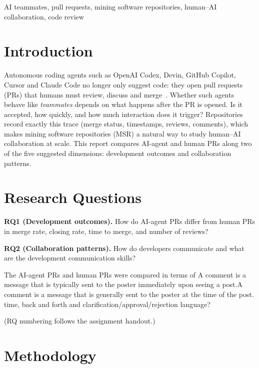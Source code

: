 \documentclass[conference]{IEEEtran}
\begin{document}
\begin{IEEEkeywords}
AI teammates, pull requests, mining software repositories, human--AI collaboration, code review
\end{IEEEkeywords}

\section{Introduction}
Autonomous coding agents such as OpenAI Codex, Devin, GitHub Copilot, Cursor and Claude Code no longer only suggest code: they open pull requests (PRs) that humans must review, discuss and merge~\cite{li2025rise}. Whether such agents behave like \emph{teammates} depends on what happens after the PR is opened. Is it accepted, how quickly, and how much interaction does it trigger? Repositories record exactly this trace (merge status, timestamps, reviews, comments), which makes mining software repositories (MSR) a natural way to study human--AI collaboration at scale. This report compares AI-agent and human PRs along two of the five suggested dimensions: development outcomes and collaboration patterns.

\section{Research Questions}
\textbf{RQ1 (Development outcomes).} How do AI-agent PRs differ from human PRs in merge rate, closing rate, time to merge, and number of reviews?

\textbf{RQ2 (Collaboration patterns).} How do developers communicate and what are the development communication skills?

The AI-agent PRs and human PRs were compared in terms of
A comment is a message that is typically sent to the poster immediately upon seeing a post.A comment is a message that is generally sent to the poster at the time of the post.
time, back and forth and clarification/approval/rejection language?

\noindent (RQ numbering follows the assignment handout.)

\section{Methodology}
\end{document}
